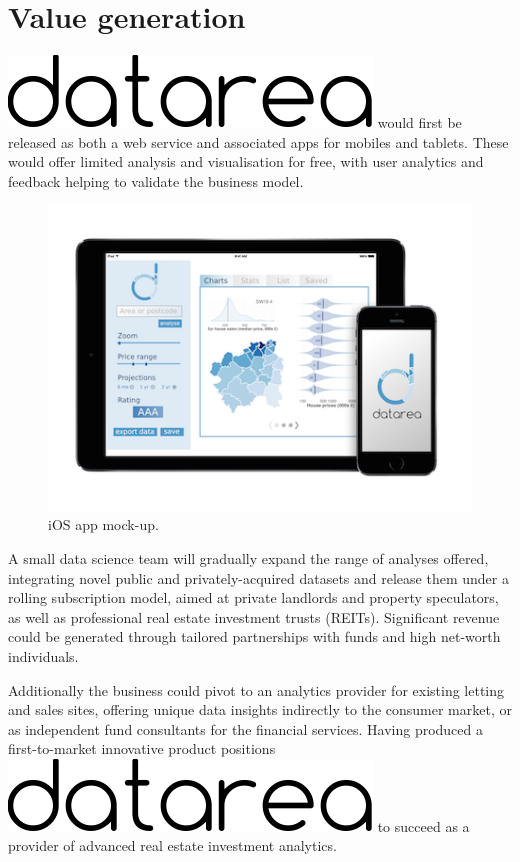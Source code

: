 \documentclass[
10pt, %
a4paper, %
oneside, %
headinclude,footinclude, %
BCOR5mm, %
]{scrartcl}
\newcommand*{\logo}{\includegraphics[scale=.22]{Figures/datarea.pdf}}
\begin{document}
{\let\thefootnote\relax{}}

\vspace{-2em}
\section{Value generation}

\logo \hspace{.1em} would first be released as both a web service and
associated apps for mobiles and tablets. These would offer limited
analysis and visualisation for free, with user analytics and feedback
helping to validate the business model.

\begin{figure}
\begin{center}
\includegraphics[width=.39\textwidth]{Figures/mockup.png}
\caption{ iOS app mock-up.}
\end{center}
\end{figure}

A small data science team will gradually expand the range of analyses
offered, integrating novel public and privately-acquired datasets and
release them under a rolling subscription model, aimed at private
landlords and property speculators, as well as professional real
estate investment trusts (REITs). Significant revenue could be
generated through tailored partnerships with funds and high net-worth
individuals.

Additionally the business could pivot to an analytics provider for
existing letting and sales sites, offering unique data insights
indirectly to the consumer market, or as independent fund consultants
for the financial services. Having produced a first-to-market
innovative product positions \logo \hspace{.1em} to succeed as a
provider of advanced real estate investment analytics. \\
\end{document}

